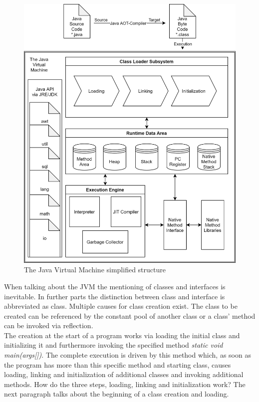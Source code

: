 \begin{figure}
	\includegraphics[scale=0.2]{../figures/JVM.png}
	\caption{The Java Virtual Machine simplified structure}
	\label{fig:jvm}
\end{figure}
When talking about the JVM the mentioning of classes and interfaces is inevitable.
In further parts the distinction between class and interface is abbreviated as class.
Multiple causes for class creation exist. The class to be created can be referenced by the constant pool of another class or a class' method can be invoked via reflection.\\
The creation at the start of a program works via loading the initial class and initializing it and furthermore invoking the specified method \emph{static void main(args[])}. The complete execution is driven by this method which, as soon as the program has more than this specific method and starting class, causes loading, linking and initialization of additional classes and invoking additional methods. How do the three steps, loading, linking and initialization work? The next paragraph talks about the beginning of a class creation and loading.\\
